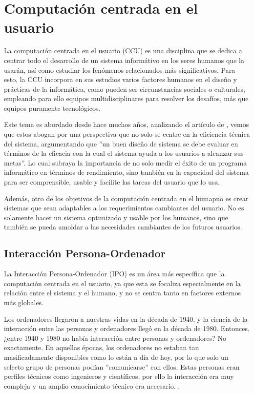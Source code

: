 \section{Computación centrada en el usuario}

La computación centrada en el usuario (CCU) es una disciplina que se dedica a  centrar todo el desarrollo de un sistema informátivo en los seres humanos que la usarán, así como estudiar los fenómenos relacionados más significativos. Para esto, la CCU incorpora en sus estudios varios factores humanos en el diseño y prácticas de la informática, como pueden ser circunstancias sociales o culturales, empleando para ello equipos multidisciplinares para resolver los desafíos, más que equipos puramente tecnológicos.

Este tema es abordado desde hace muchos años, analizando el artículo de \cite{Card1983ThePO}, vemos que estos abogan por una perspectiva que no solo se centre en la eficiencia técnica del sistema, argumentando que ''un buen diseño de sistema se debe evaluar en términos de la eficacia con la cual el sistema ayuda a los usuarios a alcanzar sus metas''. Lo cual subraya la importancia de no solo medir el éxito de un programa informático en términos de rendimiento, sino también en la capacidad del sistema para ser comprensible, usable y facilite las tareas del usuario que lo usa.

Además, otro de los objetivos de la computación centrada en el humapno es crear sistemas que sean adaptables a los requerimientos cambiantes del usuario. No es solamente hacer un sistema optimizado y usable por los humanos, sino que también se pueda amoldar a las necesidades cambiantes de los futuros usuarios.

\subsection{Interacción Persona-Ordenador }

La Interacción Persona-Ordenador (IPO) es un área más específica que la computación centrada en el usuario, ya que esta se focaliza especialmente en la relación entre el sistema y el humano, y no se centra tanto en factores externos más globales.

Los ordenadores llegaron a nuestras vidas en la década de 1940, y la ciencia de la interacción entre las personas y ordenadores llegó en la década de 1980. Entonces, ¿entre 1940 y 1980 no había interacción entre personas y ordenadores? No exactamente. En aquellas épocas, los ordenadores no estaban tan masificadamente disponibles como lo están a día de hoy, por lo que solo un selecto grupo de personas podían ''comunicarse'' con ellos. Estas personas eran perfiles técnicos como ingenieros y científicos, por ello la interacción era muy compleja y un amplio conocimiento técnico era necesario. \citep{mackenzie2012human}.

